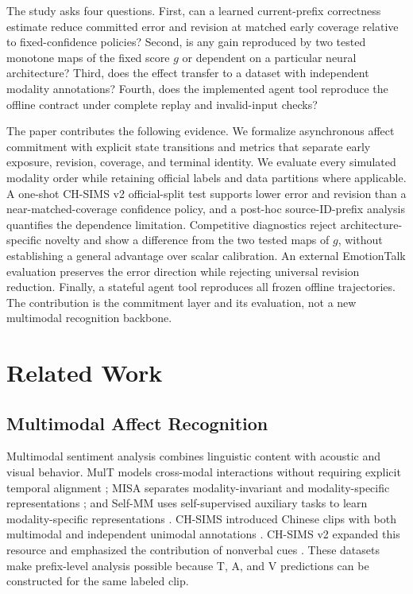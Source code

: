 \documentclass[journal]{IEEEtran}
\begin{document}
The study asks four questions. First, can a learned current-prefix correctness estimate reduce committed error and revision at matched early coverage relative to fixed-confidence policies? Second, is any gain reproduced by two tested monotone maps of the fixed score $g$ or dependent on a particular neural architecture? Third, does the effect transfer to a dataset with independent modality annotations? Fourth, does the implemented agent tool reproduce the offline contract under complete replay and invalid-input checks?

The paper contributes the following evidence. We formalize asynchronous affect commitment with explicit state transitions and metrics that separate early exposure, revision, coverage, and terminal identity. We evaluate every simulated modality order while retaining official labels and data partitions where applicable. A one-shot CH-SIMS v2 official-split test supports lower error and revision than a near-matched-coverage confidence policy, and a post-hoc source-ID-prefix analysis quantifies the dependence limitation. Competitive diagnostics reject architecture-specific novelty and show a difference from the two tested maps of $g$, without establishing a general advantage over scalar calibration. An external EmotionTalk evaluation preserves the error direction while rejecting universal revision reduction. Finally, a stateful agent tool reproduces all frozen offline trajectories. The contribution is the commitment layer and its evaluation, not a new multimodal recognition backbone.

\section{Related Work}

\subsection{Multimodal Affect Recognition}

Multimodal sentiment analysis combines linguistic content with acoustic and visual behavior. MulT models cross-modal interactions without requiring explicit temporal alignment \cite{tsai2019mult}; MISA separates modality-invariant and modality-specific representations \cite{hazarika2020misa}; and Self-MM uses self-supervised auxiliary tasks to learn modality-specific representations \cite{yu2021selfmm}. CH-SIMS introduced Chinese clips with both multimodal and independent unimodal annotations \cite{yu2020chsims}. CH-SIMS v2 expanded this resource and emphasized the contribution of nonverbal cues \cite{liu2022chsimsv2}. These datasets make prefix-level analysis possible because T, A, and V predictions can be constructed for the same labeled clip.
\end{document}
